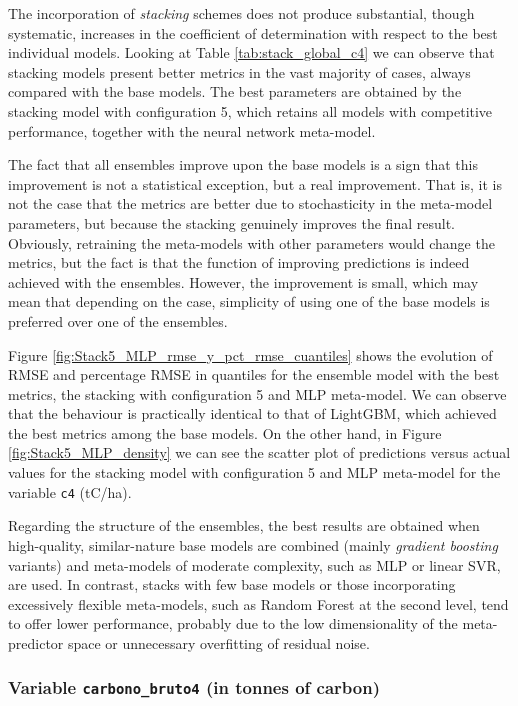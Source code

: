 The incorporation of \textit{stacking} schemes does not produce substantial, though systematic, increases in the coefficient of determination with respect to the best individual models. Looking at Table \ref{tab:stack_global_c4} we can observe that stacking models present better metrics in the vast majority of cases, always compared with the base models. The best parameters are obtained by the stacking model with configuration 5, which retains all models with competitive performance, together with the neural network meta-model.

The fact that all ensembles improve upon the base models is a sign that this improvement is not a statistical exception, but a real improvement. That is, it is not the case that the metrics are better due to stochasticity in the meta-model parameters, but because the stacking genuinely improves the final result. Obviously, retraining the meta-models with other parameters would change the metrics, but the fact is that the function of improving predictions is indeed achieved with the ensembles. However, the improvement is small, which may mean that depending on the case, simplicity of using one of the base models is preferred over one of the ensembles.

Figure \ref{fig:Stack5_MLP_rmse_y_pct_rmse_cuantiles} shows the evolution of RMSE and percentage RMSE in quantiles for the ensemble model with the best metrics, the stacking with configuration 5 and MLP meta-model. We can observe that the behaviour is practically identical to that of LightGBM, which achieved the best metrics among the base models.
On the other hand, in Figure \ref{fig:Stack5_MLP_density} we can see the scatter plot of predictions versus actual values for the stacking model with configuration 5 and MLP meta-model for the variable \texttt{c4} (tC/ha).


Regarding the structure of the ensembles, the best results are obtained when high-quality, similar-nature base models are combined (mainly \textit{gradient boosting} variants) and meta-models of moderate complexity, such as MLP or linear SVR, are used. In contrast, stacks with few base models or those incorporating excessively flexible meta-models, such as Random Forest at the second level, tend to offer lower performance, probably due to the low dimensionality of the meta-predictor space or unnecessary overfitting of residual noise.



\subsubsection{Variable \texttt{carbono\_bruto4} (in tonnes of carbon)}
\vspace{0.3cm}
